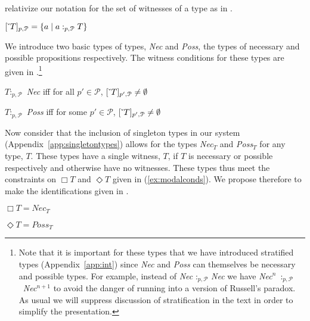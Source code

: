 relativize our notation for the set of witnesses of a type as in
\nexteg{}.
\begin{ex} 
$[\ \!\check{}\ \!T]_{p,\mathcal{P}} = \{a\mid a:_{p,\mathcal{P}}T\}$ 
\end{ex} 
We introduce two basic types of types, \textit{Nec} and \textit{Poss},
the types of necessary and possible propositions respectively.  The
witness conditions for these types are given in
\nexteg{}.\footnote{Note that it is important for these types that we
  have introduced stratified types (Appendix~\ref{app:int}) since
  \textit{Nec} and \textit{Poss} can themselves be necessary and
  possible types. For example, instead of \textit{Nec}
  :$_{p,\mathcal{P}}$ \textit{Nec} we have \mbox{\textit{Nec}$^n$
  :$_{p,\mathcal{P}}$ \textit{Nec}$^{n+1}$} to avoid the danger of
  running into a version of Russell's paradox.  As usual we will
  suppress discussion of stratification in the text in order to
  simplify the presentation.}
\begin{ex} 
\begin{subex} 
 
\item $T:_{p,\mathcal{P}}$ \textit{Nec} iff for all
  $p'\in\mathcal{P}$, $[\ \!\check{}\ \!T]_{p',\mathcal{P}}\not=\emptyset$ 
 
\item $T:_{p,\mathcal{P}}$ \textit{Poss} iff for some
  $p'\in\mathcal{P}$, $[\ \!\check{}\ \!T]_{p',\mathcal{P}}\not=\emptyset$  
 
\end{subex} 
   
\end{ex} 
Now consider that the inclusion of singleton types in our system
(Appendix~\ref{app:singletontypes}) allows for the types
\textit{Nec}$_T$ and \textit{Poss}$_T$ for any type, $T$.  These types
have a single witness, $T$, if $T$ is necessary or possible
respectively and otherwise have no witnesses. These types thus meet
the constraints on $\Box T$ and $\Diamond T$ given in
(\ref{ex:modalconds}).  We propose therefore to make the
identifications given in \nexteg{}.
\begin{ex} 
\begin{subex} 
 
\item $\Box T = \textit{Nec}_T$ 
 
\item $\Diamond T = \textit{Poss}_T$ 
 
\end{subex} 
   
\end{ex}

